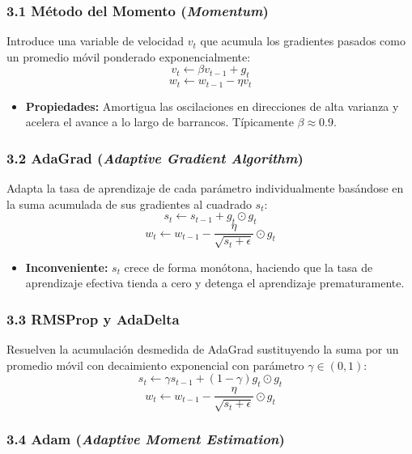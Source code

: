 \subsubsection{3.1 Método del Momento (\emph{Momentum})}

Introduce una variable de velocidad $v_t$ que acumula los gradientes pasados como un promedio móvil ponderado exponencialmente:
$$v_t \leftarrow \beta v_{t-1} + g_t$$
$$w_t \leftarrow w_{t-1} - \eta v_t$$

\begin{itemize}
	\item \textbf{Propiedades:} Amortigua las oscilaciones en direcciones de alta varianza y acelera el avance a lo largo de barrancos. Típicamente $\beta \approx 0.9$.
\end{itemize}

\subsubsection{3.2 AdaGrad (\emph{Adaptive Gradient Algorithm})}

Adapta la tasa de aprendizaje de cada parámetro individualmente basándose en la suma acumulada de sus gradientes al cuadrado $s_t$:
$$s_t \leftarrow s_{t-1} + g_t \odot g_t$$
$$w_t \leftarrow w_{t-1} - \frac{\eta}{\sqrt{s_t + \epsilon}} \odot g_t$$

\begin{itemize}
	\item \textbf{Inconveniente:} $s_t$ crece de forma monótona, haciendo que la tasa de aprendizaje efectiva tienda a cero y detenga el aprendizaje prematuramente.
\end{itemize}

\subsubsection{3.3 RMSProp y AdaDelta}

Resuelven la acumulación desmedida de AdaGrad sustituyendo la suma por un promedio móvil con decaimiento exponencial con parámetro $\gamma \in (0, 1)$:
$$s_t \leftarrow \gamma s_{t-1} + (1 - \gamma) g_t \odot g_t$$
$$w_t \leftarrow w_{t-1} - \frac{\eta}{\sqrt{s_t + \epsilon}} \odot g_t$$

\subsubsection{3.4 Adam (\emph{Adaptive Moment Estimation})}

